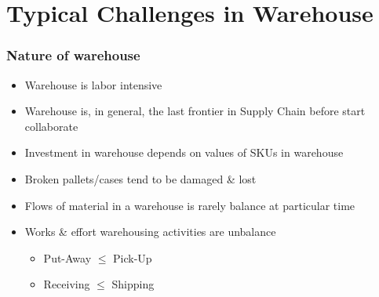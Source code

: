 \documentclass[10pt,handout,notes=show]{beamer}
\begin{document}
\section[Challenges]{Typical Challenges in Warehouse}

  \begin{frame}
  \frametitle{Nature of warehouse}

  \begin{itemize}
    \item Warehouse is \alert{labor intensive}
    \item Warehouse is, in general, the \alert{last frontier} in Supply Chain before start collaborate
    \item Investment in warehouse depends on \alert{values of SKUs} in warehouse
    \item \alert{Broken pallets/cases} tend to be damaged \& lost
    \item Flows of material in a warehouse is \alert{rarely balance} at particular time
    \item Works \& effort warehousing activities are \alert{unbalance}
    \begin{itemize}
      \item<2-> Put-Away $\leq$ Pick-Up
      \item<2-> Receiving $\leq$ Shipping
    \end{itemize}
  \end{itemize}

  \end{frame}
\end{document}
